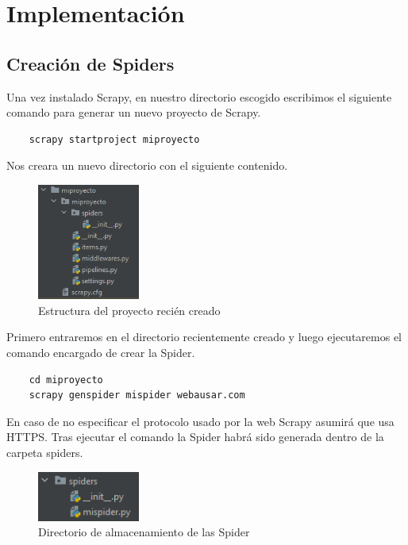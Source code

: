 \chapter[Implementación]{Implementación}
\label{Chap5}

\section{Creación de Spiders}
Una vez instalado Scrapy, en nuestro directorio escogido escribimos el siguiente comando para generar un nuevo proyecto de Scrapy.

\begin{verbatim}
	scrapy startproject miproyecto
\end{verbatim}

Nos creara un nuevo directorio con el siguiente contenido.

\begin{figure} [h!]
	\centering
	\includegraphics[width=0.3\textwidth]{fig/estructura_proyecto_scrapy.png}
	\caption[Estructura del proyecto recién creado]{Estructura del proyecto recién creado}
	\label{fig:ej11}
\end{figure}

Primero entraremos en el directorio recientemente creado y luego ejecutaremos el comando encargado de crear la Spider.

\begin{verbatim}
	cd miproyecto
	scrapy genspider mispider webausar.com
\end{verbatim}

En caso de no especificar el protocolo usado por la web Scrapy asumirá que usa HTTPS.\newline
\newline
Tras ejecutar el comando la Spider habrá sido generada dentro de la carpeta spiders.

\begin{figure} [h!]
	\centering
	\includegraphics[width=0.3\textwidth]{fig/primera_spider.png}
	\caption[Directorio de almacenamiento de las Spider]{Directorio de almacenamiento de las Spider}
	\label{fig:ej12}
\end{figure}

